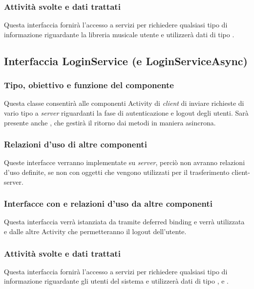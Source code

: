 \subsubsection*{Attivit\`a svolte e dati trattati}
Questa interfaccia fornir\`a l'accesso a servizi per richiedere qualsiasi tipo
di informazione riguardante la libreria musicale utente e utilizzer\`a dati di
tipo .


\subsection{Interfaccia LoginService (e LoginServiceAsync)}
\subsubsection*{Tipo, obiettivo e funzione del componente}
Questa classe consentir\`a alle componenti Activity di \emph{client} di inviare
richieste di vario tipo a \emph{server} riguardanti la fase di autenticazione e
logout degli utenti. Sar\`a presente anche , che gestir\`a
il ritorno dai metodi in maniera asincrona.

\subsubsection*{Relazioni d'uso di altre componenti}
Queste interfacce verranno implementate su \emph{server}, perci\`o non
avranno relazioni d'uso definite, se non con oggetti  che
vengono utilizzati per il trasferimento client-server.

\subsubsection*{Interfacce con e relazioni d'uso da altre componenti}
Questa interfaccia verr\`a istanziata da  tramite deferred
binding e verr\`a utilizzata \\ e dalle altre Activity che
permetteranno il logout dell'utente.

\subsubsection*{Attivit\`a svolte e dati trattati}
Questa interfaccia fornir\`a l'accesso a servizi per richiedere qualsiasi tipo
di informazione riguardante gli utenti del sistema e utilizzer\`a dati di tipo
,  e .


